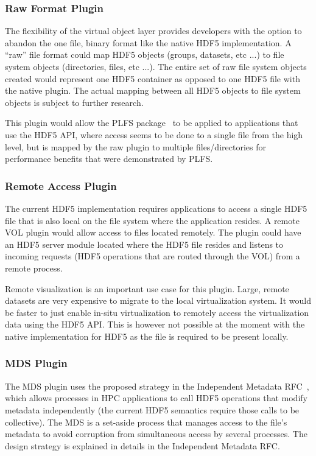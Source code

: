 \documentclass[letterpaper,hyper]{THG_RFC}
\begin{document}
\subsubsection{Raw Format Plugin}
The flexibility of the virtual object layer provides developers with the option to abandon the one file, binary format like the native HDF5 implementation. A ``raw'' file format could map HDF5 objects (groups, datasets, etc ...) to file system objects (directories, files, etc ...). The entire set of raw file system objects created would represent one HDF5 container as opposed to one HDF5 file with the native plugin. The actual mapping between all HDF5 objects to file system objects is subject to further research.

This plugin would allow the PLFS package~\cite{plfs} to be applied to applications that use the HDF5 API, where access seems to be done to a single file from the high level, but is mapped by the raw plugin to multiple files/directories for performance benefits that were demonstrated by PLFS.

\subsubsection{Remote Access Plugin}
The current HDF5 implementation requires applications to access a single HDF5 file that is also local on the file system where the application resides. A remote VOL plugin would allow access to files located remotely. The plugin could have an HDF5 server module located where the HDF5 file resides and listens to incoming requests (HDF5 operations that are routed through the VOL) from a remote process. 

Remote visualization is an important use case for this plugin. Large, remote datasets are very expensive to migrate to the local virtualization system. It would be faster to just enable in-situ virtualization to remotely access the virtualization data using the HDF5 API. This is however not possible at the moment with the native implementation for HDF5 as the file is required to be present locally.

\subsubsection{MDS Plugin}
The MDS plugin uses the proposed strategy in the Independent Metadata RFC~\cite{mds}, which allows processes in HPC applications to call HDF5 operations that modify metadata independently (the current HDF5 semantics require those calls to be collective). The MDS is a set-aside process that manages access to the file's metadata to avoid corruption from simultaneous access by several processes. The design strategy is explained in details in the Independent Metadata RFC.
\end{document}
